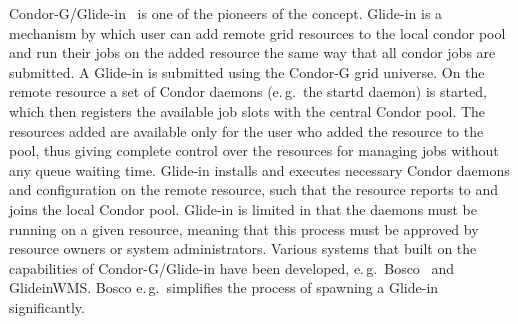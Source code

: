 \documentclass{sig-alternate}
\begin{document}
Condor-G/Glide-in~\cite{condor-g} is one of the pioneers of the \pilotjob
concept. Glide-in is a mechanism by which user can add remote grid resources
to the local condor pool and run their jobs on the added resource the same way
that all condor jobs are submitted. A Glide-in is submitted using the Condor-G
grid universe.
On the remote resource a set of Condor daemons (e.\,g.\ the
startd daemon) is started, which then registers the available job slots with
the central Condor pool. The resources added are available only for the user
who added the resource to the pool, thus giving complete control over the
resources for managing jobs without any queue waiting time. Glide-in installs
and executes necessary Condor daemons and configuration on the remote
resource, such that the resource reports to and joins the local Condor pool.
Glide-in is limited in that the daemons must be running on a given resource,
meaning that this process must be approved by resource owners or system
administrators. Various systems that built on the \pilot capabilities of
Condor-G/Glide-in have been developed, e.\,g.\ Bosco~\cite{bosco} and
GlideinWMS. Bosco e.\,g.\ simplifies the process of spawning a Glide-in
significantly.






\end{document}
